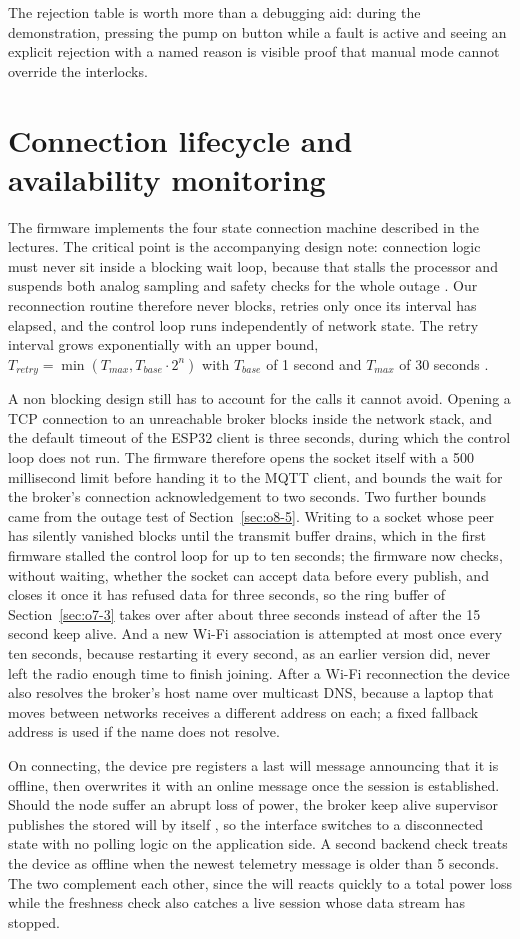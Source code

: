 The rejection table is worth more than a debugging aid: during the demonstration, pressing the pump on button while a fault is active and seeing an explicit rejection with a named reason is visible proof that manual mode cannot override the interlocks.

\section{Connection lifecycle and availability monitoring}
\label{sec:o4-4}

The firmware implements the four state connection machine described in the lectures. The critical point is the accompanying design note: connection logic must never sit inside a blocking wait loop, because that stalls the processor and suspends both analog sampling and safety checks for the whole outage \cite{slide03}. Our reconnection routine therefore never blocks, retries only once its interval has elapsed, and the control loop runs independently of network state. The retry interval grows exponentially with an upper bound, $T_{retry} = \min(T_{max}, T_{base} \cdot 2^{n})$ with $T_{base}$ of 1 second and $T_{max}$ of 30 seconds \cite{slide06}.

A non blocking design still has to account for the calls it cannot avoid. Opening a TCP connection to an unreachable broker blocks inside the network stack, and the default timeout of the ESP32 client is three seconds, during which the control loop does not run. The firmware therefore opens the socket itself with a 500 millisecond limit before handing it to the MQTT client, and bounds the wait for the broker's connection acknowledgement to two seconds. Two further bounds came from the outage test of Section~\ref{sec:o8-5}. Writing to a socket whose peer has silently vanished blocks until the transmit buffer drains, which in the first firmware stalled the control loop for up to ten seconds; the firmware now checks, without waiting, whether the socket can accept data before every publish, and closes it once it has refused data for three seconds, so the ring buffer of Section~\ref{sec:o7-3} takes over after about three seconds instead of after the 15 second keep alive. And a new Wi-Fi association is attempted at most once every ten seconds, because restarting it every second, as an earlier version did, never left the radio enough time to finish joining. After a Wi-Fi reconnection the device also resolves the broker's host name over multicast DNS, because a laptop that moves between networks receives a different address on each; a fixed fallback address is used if the name does not resolve.

On connecting, the device pre registers a last will message announcing that it is offline, then overwrites it with an online message once the session is established. Should the node suffer an abrupt loss of power, the broker keep alive supervisor publishes the stored will by itself \cite{slide03}, so the interface switches to a disconnected state with no polling logic on the application side. A second backend check treats the device as offline when the newest telemetry message is older than 5 seconds. The two complement each other, since the will reacts quickly to a total power loss while the freshness check also catches a live session whose data stream has stopped.
